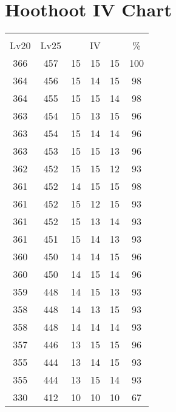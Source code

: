 \documentclass{article}%
\begin{document}
%
\normalsize%
\section{Hoothoot IV Chart}%
\label{sec:Hoothoot IV Chart}%
\renewcommand{\arraystretch}{1.5}%
\begin{tabular}{|c|c|c|c|c|c|}%
\hline%
\multicolumn{6}{|c|}{\textcolor{white}{ 
\linebreak{Hoothoot}
}%
\cellcolor{black}}\\%
\multicolumn{1}{|c}{Lv20}&\multicolumn{1}{c|}{Lv25}&\multicolumn{3}{c|}{IV}&\multicolumn{1}{|c|}{\%}\\%
\hline%
\rowcolor{color100}%
366&457&15&15&15&100\\%
\hline%
\rowcolor{color98}%
364&456&15&14&15&98\\%
\hline%
\rowcolor{color98}%
364&455&15&15&14&98\\%
\hline%
\rowcolor{color96}%
363&454&15&13&15&96\\%
\hline%
\rowcolor{color96}%
363&454&15&14&14&96\\%
\hline%
\rowcolor{color96}%
363&453&15&15&13&96\\%
\hline%
\rowcolor{color93}%
362&452&15&15&12&93\\%
\hline%
\rowcolor{color98}%
361&452&14&15&15&98\\%
\hline%
\rowcolor{color93}%
361&452&15&12&15&93\\%
\hline%
\rowcolor{color93}%
361&452&15&13&14&93\\%
\hline%
\rowcolor{color93}%
361&451&15&14&13&93\\%
\hline%
\rowcolor{color96}%
360&450&14&14&15&96\\%
\hline%
\rowcolor{color96}%
360&450&14&15&14&96\\%
\hline%
\rowcolor{color93}%
359&448&14&15&13&93\\%
\hline%
\rowcolor{color93}%
358&448&14&13&15&93\\%
\hline%
\rowcolor{color93}%
358&448&14&14&14&93\\%
\hline%
\rowcolor{color96}%
357&446&13&15&15&96\\%
\hline%
\rowcolor{color93}%
355&444&13&14&15&93\\%
\hline%
\rowcolor{color93}%
355&444&13&15&14&93\\%
\hline%
\rowcolor{color91}%
330&412&10&10&10&67\\%
\end{tabular}

%
\end{document}
